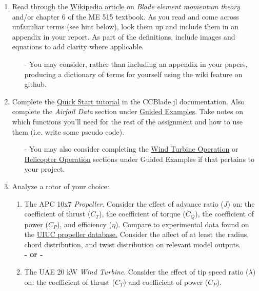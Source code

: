 \documentclass[12pt]{article}
\begin{document}
\begin{enumerate}
	\item Read  through the \href{https://en.wikipedia.org/wiki/Blade_element_momentum_theory}{Wikipedia article} on \textit{Blade element momentum theory} and/or chapter 6 of the ME 515 textbook. As you read and come across unfamiliar terms (see hint below), look them up and include them in an appendix in your report.  As part of the definitions, include images and equations to add clarity where applicable.
	\begin{itemize}
		\item[-] You may consider, rather than including an appendix in your papers, producing a dictionary of terms for yourself using the wiki feature on github.
	\end{itemize}
	\item Complete the \href{https://flow.byu.edu/CCBlade.jl/stable/tutorial/}{Quick Start tutorial} in the CCBlade.jl documentation. 
	Also complete the \textit{Airfoil Data} section under \href{https://flow.byu.edu/CCBlade.jl/stable/howto/#Airfoil-Data}{Guided Examples}. 
	Take notes on which functions you'll need for the rest of the assignment and how to use them (i.e. write some pseudo code).
	\begin{itemize}
		\item[-] You may also consider completing the \href{https://flow.byu.edu/CCBlade.jl/stable/howto/#Wind-Turbine-Operation}{Wind Turbine Operation} or \href{https://flow.byu.edu/CCBlade.jl/stable/howto/#Helicopter-Operation}{Helicopter Operation} sections under Guided Examples if that pertains to your project. 
	\end{itemize} 
	\item Analyze a rotor of your choice:
	\begin{enumerate}
		\item The APC 10x7 \textit{Propeller}. Consider the effect of advance ratio ($J$) on: the coefficient of thrust ($C_T$), the coefficient of torque ($C_Q$), the coefficient of power ($C_P$), and efficiency ($\eta$).  Compare to experimental data found on the \href{https://m-selig.ae.illinois.edu/props/propDB.html}{UIUC propeller database.} Consider the affect of at least the radius, chord distribution, and twist distribution on relevant model outputs. \\
		\textbf{- or -}
		\item The UAE 20 kW \textit{Wind Turbine}. Consider the effect of tip speed ratio ($\lambda$) on: the coefficient of thrust ($C_T$) and coefficient of power ($C_P$).

\end{enumerate}
\end{enumerate}
\end{document}
